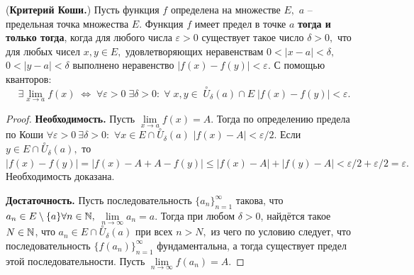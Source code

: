\begin{theorem} (\textbf{Критерий Коши.})
    Пусть функция $f$ определена на множестве $E,$
    $a$ -- предельная точка множества $E.$
    Функция $f$ имеет предел в точке $a$
    \textbf{тогда и только тогда}, когда для любого
    числа $\varepsilon>0$ существует такое число
    $\delta>0,$ что для любых чисел $x, y \in E,$
    удовлетворяющих неравенствам $0<|x-a|<\delta,$
    $0<|y-a|<\delta$ выполнено неравенство $|f(x)-
        f(y)|<\varepsilon.$ С помощью кванторов:
    $$\exists \lim\limits_{x\rightarrow a}f(x)\;
        \Leftrightarrow\;\forall \varepsilon > 0\;
        \exists \delta >0 :\;\forall \;x, y \in\;
        \stackrel{\circ}{U}_{\delta}(a) \cap E\;
        |f(x) - f(y)| < \varepsilon.
    $$
\end{theorem}
\begin{proof}
    \textbf{Необходимость.}
    Пусть $\lim\limits_{x\rightarrow a}f(x)=A$.
    Тогда по определению
    предела по Коши $\forall\varepsilon>0  \ \exists\delta>0:$
    $\forall x \in E\cap\stackrel{\circ}{U}_{\delta}(a)$
    $|f(x)-A|<\varepsilon/2.$ Если $y \in
        E\cap\stackrel{\circ}{U}_{\delta}(a),$
    то $|f(x) - f(y)| = |f(x) - A + A -
        f(y)| \leq |f(x) - A| + |f(y) - A|
        < \varepsilon/2 + \varepsilon/2=\varepsilon.$
    Необходимость доказана.

    \textbf{Достаточность.}
    Пусть последовательность $\{a_n\}_{n=1}^{\infty}$
    такова, что
    $a_n \in E\setminus\{a\}\forall n \in \mathbb{N},$
    $\lim\limits_{n\rightarrow\infty}a_n=a.$
    Тогда при любом $\delta>0$,
    найдётся такое $N \in \mathbb{N}$, что
    $a_n \in E\cap\stackrel{\circ}{U}_{\delta}(a)$
    при всех $n > N,$ из чего по условию следует, что
    последовательность $\{f(a_n)\}_{n=1}^{\infty}$
    фундаментальна, а тогда существует
    предел этой последовательности.
    Пусть $\lim\limits_{n\rightarrow\infty}f(a_n)=A.$


\end{proof}
